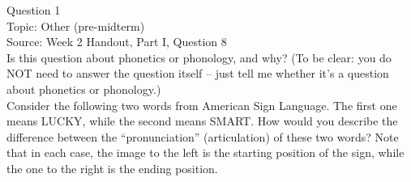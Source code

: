 \documentclass[12pt]{article}
\begin{document}
\begin{center}
\textbf{{\color{violet}{\HUGE 20201102 Monday\\}}}

\textbf{{\color{violet}{\HUGE ALL EXAMS\\}}}

\end{center}
\newpage

\begin{center}
\textbf{{\color{blue}{\HUGE START OF EXAM\\}}}

\textbf{{\color{blue}{\HUGE Student ID: 78680\\}}}

\textbf{{\color{blue}{\HUGE 4:00\\}}}

\end{center}
\newpage

{\large Question 1}\\

Topic: Other (pre-midterm)\\
Source: Week 2 Handout, Part I, Question 8\\

Is this question about phonetics or phonology, and why? (To be clear: you do NOT need to answer the question itself -- just tell me whether it's a question about phonetics or phonology.)\\

Consider the following two words from American Sign Language. The first one means LUCKY, while the second means SMART. How would you describe the difference between the ``pronunciation'' (articulation) of these two words? Note that in each case, the image to the left is the starting position of the sign, while the one to the right is the ending position.
\end{document}
